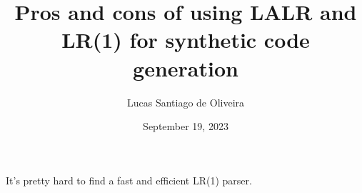 \documentclass{article}
\title{Pros and cons of using LALR and LR(1) for synthetic code generation}
\author{Lucas Santiago de Oliveira}
\date{September 19, 2023}
\begin{document}
    \maketitle

    It's pretty hard to find a fast and efficient LR(1) parser.
\end{document}
